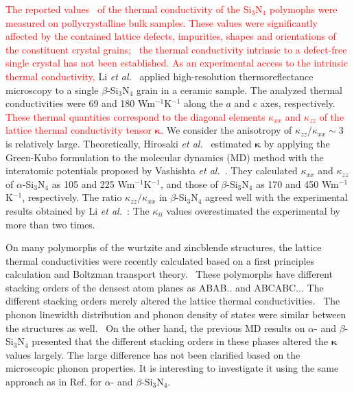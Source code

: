 \documentclass[twocolumn,amsmath,amssymb,a4paper,prb,superscriptaddress,floatfix]{revtex4-1}
\begin{document}
\textcolor{red}{The reported values~\cite{zhou,hirao-rev,watari,hirosaki,hirai}
of the thermal conductivity of the Si$_3$N$_4$ polymophs were measured on
pollycrystalline bulk samples. These values were significantly affected by
the contained lattice defects, impurities, shapes and orientations of the
constituent crystal grains;~\cite{hirosaki-md} the thermal conductivity intrinsic to a
defect-free single crystal has not been established. As
an experimental access to the intrinsic thermal conductivity,} Li {\it et
al.}~\cite{li} applied high-resolution thermoreflectance microscopy to a single
$\beta$-Si$_3$N$_4$ grain in a ceramic sample. The analyzed thermal
conductivities were 69 and 180 Wm$^{-1}$K$^{-1}$ along the $a$ and $c$ axes,
respectively. \textcolor{red}{These thermal quantities correspond to the diagonal elements
$\kappa_{xx}$ and $\kappa_{zz}$ of the lattice thermal conductivity tensor
$\boldsymbol{\kappa}$.} We consider the anisotropy of
$\kappa_{zz}/\kappa_{xx}\sim 3$ is relatively large.  Theoretically, Hirosaki
{\it et al.}~\cite{hirosaki-md} estimated $\boldsymbol{\kappa}$ by
applying the Green-Kubo formulation to the molecular dynamics (MD) method with
the interatomic potentials proposed by Vashishta {\it et al.}~\cite{vashishta}. 
They calculated $\kappa$$_{xx}$ and $\kappa$$_{zz}$ of
$\alpha$-Si$_3$N$_4$ as 105 and 225 Wm$^{-1}$K$^{-1}$, and those of
$\beta$-Si$_3$N$_4$ as 170 and 450 Wm$^{-1}$K$^{-1}$, respectively.
The ratio $\kappa_{zz}/\kappa_{xx}$ in $\beta$-Si$_3$N$_4$ agreed well with the
experimental results obtained by Li {\it et al.}~\cite{li}: The $\kappa_{ii}$
values overestimated the experimental by more than two times. 

On many polymorphs of the wurtzite and zincblende structures, the lattice
thermal conductivities were recently calculated based on a first principles
calculation and Boltzman transport theory.~\cite{phono3py}  These polymorphs
have different stacking orders of the densest atom planes as ABAB.. and
ABCABC...  The different stacking orders merely altered the lattice thermal
conductivities.~\cite{phono3py} The phonon linewidth distribution and phonon
density of states were similar between the structures as well.~\cite{phono3py}
On the other hand, the previous MD results on $\alpha$- and
$\beta$-Si$_3$N$_4$ presented that the different stacking orders in these
phases altered the $\boldsymbol{\kappa}$ values largely. The large
difference has not been clarified based on the microscopic phonon properties.
It is interesting to investigate it using the same approach as in
Ref. for $\alpha$- and $\beta$-Si$_3$N$_4$.
\end{document}
